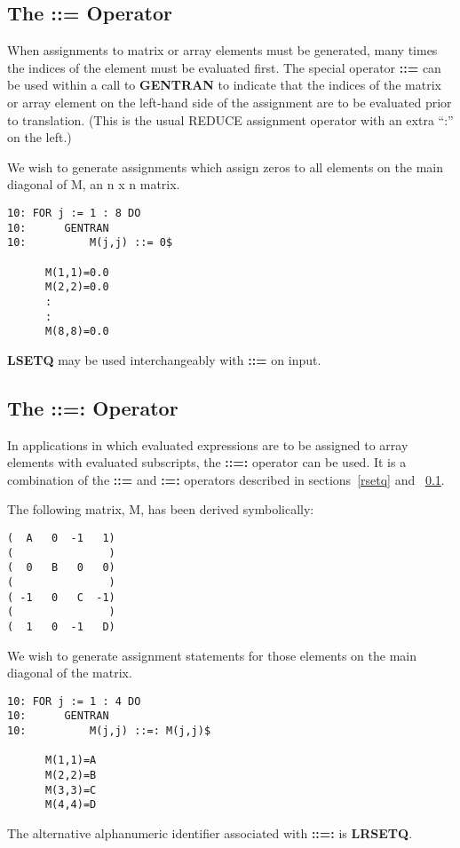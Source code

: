 \documentclass[11pt,letterpaper]{book}
\makeatletter
\newcommand{\REDUCE}{REDUCE}
\newcommand{\underscore}{\_}
\newcommand{\ttindex}[1]{{\renewcommand{\_}{\protect\underscore}%
                          \index{#1@{\tt #1}}}}
\newenvironment{describe}[1]{\par{\bf #1}\begin{indented}}{\end{indented}}
\makeatother
\begin{document}
\subsection{The ::= Operator}
\label{lsetq}
When assignments to matrix or array elements must be generated, many
times the indices of the element must be evaluated first.  The special
operator\index{::=}
{\bf ::=} can be used within a call to {\bf GENTRAN}
to indicate that the indices of the matrix or
array element on the left-hand side of the assignment are to
be evaluated prior to translation.  (This is the usual \REDUCE{}
assignment operator with an extra ``:'' on the left.)
\begin{describe}{\example}
We wish to generate assignments which assign zeros to all elements
on the main diagonal of M, an n x n matrix.
{\small\begin{verbatim}
10: FOR j := 1 : 8 DO
10:      GENTRAN
10:          M(j,j) ::= 0$

      M(1,1)=0.0
      M(2,2)=0.0
      :
      :
      M(8,8)=0.0
\end{verbatim}}
\end{describe}

{\bf LSETQ} may be used interchangeably with {\bf ::=} on input.\ttindex{LSETQ}

\subsection{The ::=: Operator}
\label{lrsetq}
\index{::=:} 
In applications in which evaluated expressions are to be assigned to
array elements with evaluated subscripts, the {\bf ::=:} operator can be
used.  It is a combination of the {\bf ::=} and {\bf :=:} operators described
in sections~\ref{rsetq} and ~\ref{lsetq}.

\begin{describe}{\example}
The following matrix, M, has been derived symbolically:
\newpage
{\small\begin{verbatim}
(  A   0  -1   1)
(               )
(  0   B   0   0)
(               )
( -1   0   C  -1)
(               )
(  1   0  -1   D)
\end{verbatim}}
We wish to generate assignment statements for those elements
on the main diagonal of the matrix.
{\small\begin{verbatim}
10: FOR j := 1 : 4 DO
10:      GENTRAN
10:          M(j,j) ::=: M(j,j)$

      M(1,1)=A
      M(2,2)=B
      M(3,3)=C
      M(4,4)=D
\end{verbatim}}
\end{describe}
The alternative alphanumeric identifier associated with {\bf ::=:} is
{\bf LRSETQ}.\ttindex{LRSETQ}
\end{document}
